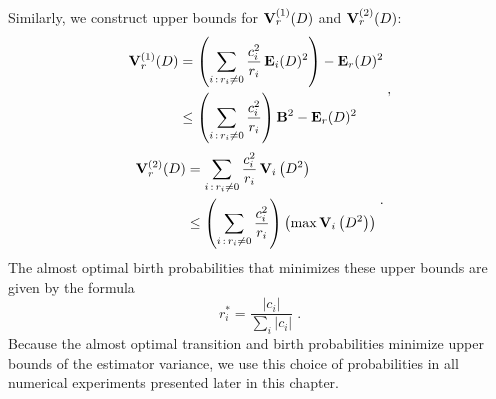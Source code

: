        Similarly, we construct upper bounds for ${\bf V}_r^{(1)}(D)$ and
        ${\bf V}_r^{(2)}(D)$:
        \[ \begin{split}
            {\bf V}_r^{(1)}(D)
            &= \left(\sum_{i\,:\,r_i\ne0} \frac{c_i^2}{r_i}\,
                     {\bf E}_i(D)^2\right) - {\bf E}_r(D)^2 \\
            &\le \left( \sum_{i\,:\,r_i\ne0} \frac{c_i^2}{r_i}\right)
                 \mathbf{B}^2 - {\bf E}_r(D)^2
        \end{split}\;, \]
        \[ \begin{split}
            {\bf V}_r^{(2)}(D) &= 
                \sum_{i\,:\,r_i\ne0} \frac{c_i^2}{r_i}\,
                {\bf V}_i\left(D^2\right)  \\
            &\le \left( \sum_{i\,:\,r_i\ne0} \frac{c_i^2}{r_i}\right)
                \left(\max {\bf V}_i\left(D^2\right)\right)
        \end{split}\;. \]
        The almost optimal birth probabilities that minimizes these upper
        bounds are given by the formula
        \begin{equation} \label{birth}
            r_i^* = \frac{|c_i|}{\sum_i|c_i|} \;.
        \end{equation}
        Because the almost optimal transition and birth probabilities
        minimize upper bounds of the estimator variance, we use this
        choice of probabilities in all numerical experiments presented
        later in this chapter.

    

